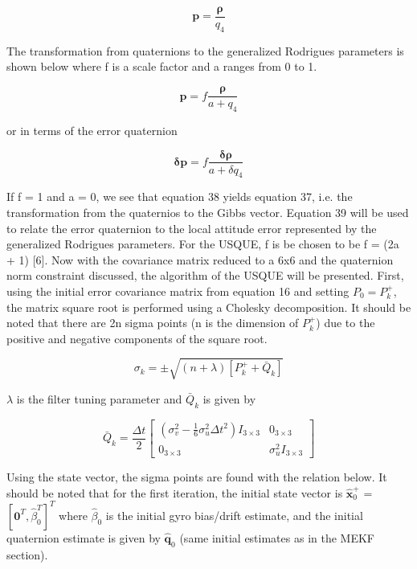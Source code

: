 \documentclass[12pt]{report}
\begin{document}
\begin{equation}
	\pmb{p} = \frac{\pmb{\rho}}{q_4}
\end{equation}  

\noindent The transformation from quaternions to the generalized Rodrigues parameters is shown below where f is a scale factor and a ranges from 0 to 1.  

\begin{equation}
	\pmb{p} = f \frac{\pmb{\rho}}{a + q_4}
\end{equation} 

\noindent or in terms of the error quaternion

 \begin{equation}
 	\pmb{\delta p} = f \frac{\pmb{\delta\rho}}{a + \delta q_4}
 \end{equation} 

\noindent If f = 1 and a = 0, we see that equation 38 yields equation 37, i.e. the transformation from the quaternios to the Gibbs vector. Equation 39 will be used to relate the error quaternion to the local attitude error represented by the generalized Rodrigues parameters. For the USQUE, f is be chosen to be f = (2a + 1) [6]. Now with the covariance matrix reduced to a 6x6 and the quaternion norm constraint discussed, the algorithm of the USQUE will be presented. First, using the initial error covariance matrix from equation 16 and setting $P_0 = P_k^+$, the matrix square root is performed using a Cholesky decomposition. It should be noted that there are 2n sigma points (n is the dimension of $P_k^+$) due to the positive and negative components of the square root. 

 \begin{equation}
	\sigma_k = \pm\sqrt{(n+\lambda)[P_k^+ + \bar{Q}_k]}
\end{equation} 

\noindent $\lambda$ is the filter tuning parameter and $\bar{Q}_k$ is given by


\begin{equation}
	\bar{Q}_k = \frac{\Delta t}{2}\begin{bmatrix}
		(\sigma_v^2 - \frac{1}{6}\sigma_u^2\Delta t^2)I_{3\times3} & 0_{3\times3} \\
		0_{3\times3} & \sigma_u^2I_{3\times3}
	\end{bmatrix}
\end{equation} 

\noindent Using the state vector, the sigma points are found with the relation below. It should be noted that for the first iteration, the initial state vector is $\pmb{\hat{x}}_0^+$ = $[\pmb{0}^T,  \hat{\beta}_0^T]^T$ where $\hat{\beta}_0$ is the initial gyro bias/drift estimate, and the initial quaternion estimate is given by $\pmb{\hat{q}}_0$ (same initial estimates as in the MEKF section). 
\end{document}

